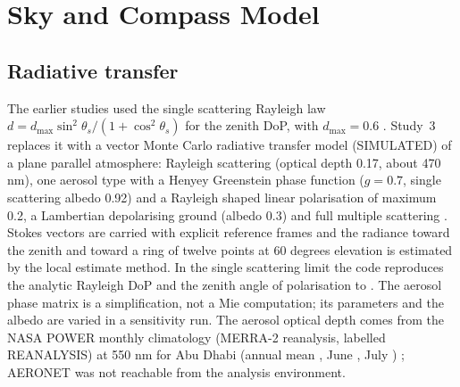\section{Sky and Compass Model}
\label{sec:sky}
\subsection{Radiative transfer}
The earlier studies used the single scattering Rayleigh law $d = d_{\max}\sin^2\theta_s/(1+\cos^2\theta_s)$ for the zenith DoP, with $d_{\max}=0.6$ \cite{horvath, liang}. Study~3 replaces it with a vector Monte Carlo radiative transfer model (SIMULATED) of a plane parallel atmosphere: Rayleigh scattering (optical depth 0.17, about 470 nm), one aerosol type with a Henyey Greenstein phase function ($g=0.7$, single scattering albedo 0.92) and a Rayleigh shaped linear polarisation of maximum 0.2, a Lambertian depolarising ground (albedo 0.3) and full multiple scattering \cite{pust, zeng08}. Stokes vectors are carried with explicit reference frames and the radiance toward the zenith and toward a ring of twelve points at 60 degrees elevation is estimated by the local estimate method. In the single scattering limit the code reproduces the analytic Rayleigh DoP and the zenith angle of polarisation to \sSSerr{}. The aerosol phase matrix is a simplification, not a Mie computation; its parameters and the albedo are varied in a sensitivity run. The aerosol optical depth comes from the NASA POWER monthly climatology (MERRA-2 reanalysis, labelled REANALYSIS) at 550 nm for Abu Dhabi (annual mean \sAODann{}, June \sAODjun{}, July \sAODjul{}) \cite{power}; AERONET was not reachable from the analysis environment.

